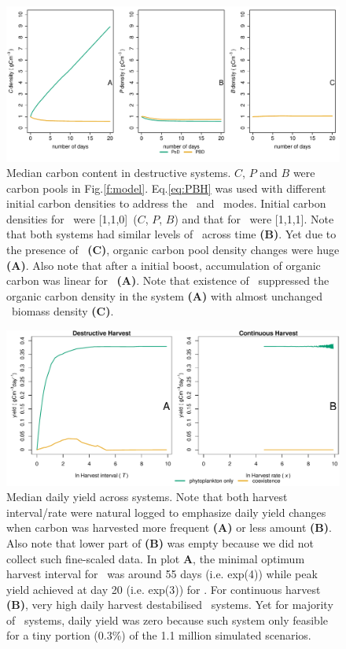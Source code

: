 \documentclass[../thesis.tex]{subfiles} %
\begin{document}
\begin{figure}[H]
    \centering
    \includegraphics[width=\linewidth]{result/Sample.pdf}
    \caption[Median carbon content in destructive systems]{Median carbon content in destructive systems.  $C$, $P$ and $B$ were carbon pools in Fig.\ref{f:model}.  Eq.\ref{eq:PBH} was used with different initial carbon densities to address the \PoN\ and \PBN\ modes.  Initial carbon densities for \PoN\ were [1,1,0]\den\ ($C$, $P$, $B$) and that for \PBN\ were [1,1,1]\den.  Note that both systems had similar levels of \phy\ across time \textbf{(B)}.  Yet due to the presence of \bac\ \textbf{(C)}, organic carbon pool density changes were huge \textbf{(A)}.  Also note that after a initial boost, accumulation of organic carbon was linear for \PoN\ \textbf{(A)}.  Note that existence of \bac\ suppressed the organic carbon density in the system \textbf{(A)} with almost unchanged \bac\ biomass density \textbf{(C)}.}
    \label{f:destCarbon}
\end{figure}

\begin{figure}[H]
    \centering
    \includegraphics[width=\linewidth]{result/DailyYield.pdf}
    \caption[Median daily yield across systems]{Median daily yield across systems.  Note that both harvest interval/rate were natural logged to emphasize daily yield changes when carbon was harvested more frequent \textbf{(A)} or less amount \textbf{(B)}.  Also note that lower part of \textbf{(B)} was empty because we did not collect such fine-scaled data.  In plot \textbf{A}, the minimal optimum harvest interval for \PoN\ was around 55 days (i.e. exp(4)) while peak yield achieved at day 20 (i.e. exp(3)) for \PBN.  For continuous harvest \textbf{(B)}, very high daily harvest destabilised \PoH\ systems.  Yet for majority of \PBH\ systems, daily yield was zero because such system only feasible for a tiny portion (0.3\%) of the 1.1 million simulated scenarios.}
    \label{f:ydDaily}
\end{figure}
\end{document}
